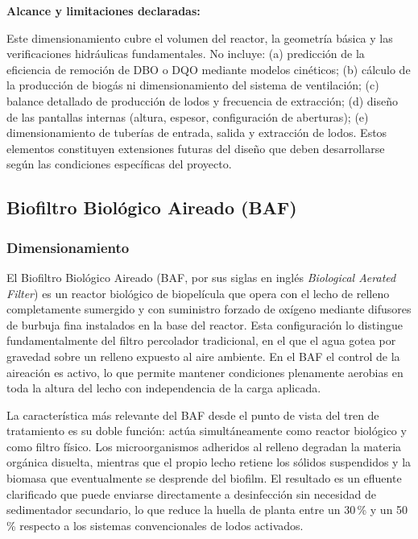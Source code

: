 \documentclass[12pt,a4paper]{article}
\begin{document}
\textbf{Alcance y limitaciones declaradas:}

Este dimensionamiento cubre el volumen del reactor, la geometría básica y las verificaciones hidráulicas fundamentales. No incluye: (a) predicción de la eficiencia de remoción de DBO o DQO mediante modelos cinéticos; (b) cálculo de la producción de biogás ni dimensionamiento del sistema de ventilación; (c) balance detallado de producción de lodos y frecuencia de extracción; (d) diseño de las pantallas internas (altura, espesor, configuración de aberturas); (e) dimensionamiento de tuberías de entrada, salida y extracción de lodos. Estos elementos constituyen extensiones futuras del diseño que deben desarrollarse según las condiciones específicas del proyecto.

\subsection{Biofiltro Biológico Aireado (BAF)}

\subsubsection{Dimensionamiento}

El Biofiltro Biológico Aireado (BAF, por sus siglas en inglés \textit{Biological Aerated Filter}) es un reactor biológico de biopelícula que opera con el lecho de relleno completamente sumergido y con suministro forzado de oxígeno mediante difusores de burbuja fina instalados en la base del reactor. Esta configuración lo distingue fundamentalmente del filtro percolador tradicional, en el que el agua gotea por gravedad sobre un relleno expuesto al aire ambiente. En el BAF el control de la aireación es activo, lo que permite mantener condiciones plenamente aerobias en toda la altura del lecho con independencia de la carga aplicada.

La característica más relevante del BAF desde el punto de vista del tren de tratamiento es su doble función: actúa simultáneamente como reactor biológico y como filtro físico. Los microorganismos adheridos al relleno degradan la materia orgánica disuelta, mientras que el propio lecho retiene los sólidos suspendidos y la biomasa que eventualmente se desprende del biofilm. El resultado es un efluente clarificado que puede enviarse directamente a desinfección sin necesidad de sedimentador secundario, lo que reduce la huella de planta entre un 30\,\% y un 50\,\% respecto a los sistemas convencionales de lodos activados.
\end{document}
